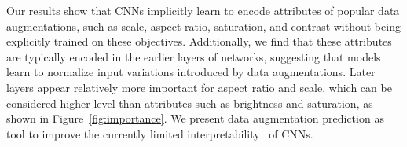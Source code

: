 Our results show that CNNs implicitly learn to encode attributes of popular data augmentations, such as scale, aspect ratio, saturation, and contrast without being explicitly trained on these objectives.
Additionally, we find that these attributes are typically encoded in the earlier layers of networks, suggesting that models learn to normalize input variations introduced by data augmentations. 
Later layers appear relatively more important for aspect ratio and scale, which can be considered higher-level than attributes such as brightness and saturation, as shown in Figure~\ref{fig:importance}.
We present data augmentation prediction as tool to improve the currently limited interpretability~\cite{lipton2018mythos} of CNNs.

%
%
